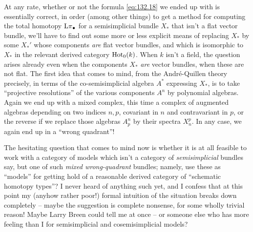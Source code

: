 At any rate, whether or not the formula \eqref{eq:132.18} we ended up
with is essentially correct, in order (among other things) to get a
method for computing the total homotopy $\operatorname{L\pi}_\bullet$ for a
semisimplicial bundle $X_*$ that isn't a flat vector bundle, we'll
have to find out some more or less explicit means of replacing $X_*$
by some $X_*'$ whose components \emph{are} flat vector bundles, and
which is isomorphic to $X_*$ in the relevant derived category
$\operatorname{Hot}_0(k)$. When $k$ isn't a field, the question arises already
even when the components $X_*$ \emph{are} vector bundles, when these
are not flat. The first idea that comes to mind, from the
André-Quillen theory precisely, in terms of the co-semisimplicial
algebra $A^*$ expressing $X_*$, is to take ``projective resolutions''
of the various components $A^n$ by polynomial algebras. Again we end
up with a mixed complex, this time a complex of augmented algebras
depending on two indices $n,p$, covariant in $n$ and contravariant in
$p$, or the reverse if we replace those algebras $A^n_p$ by their
spectra $X_n^p$. In any case, we again end up in a ``wrong quadrant''!

The hesitating question that comes to mind now is whether it is at all
feasible to work with a category of models which isn't a category of
\emph{semisimplicial} bundles say, but one of such \emph{mixed
  wrong-quadrant} bundles; namely, use these as ``models'' for getting
hold of a reasonable derived category of ``schematic homotopy types''?
I never heard of anything such yet, and I confess that at this point
my (anyhow rather poor!) formal intuition of the situation breaks down
completely -- maybe the suggestion is complete nonsense, for some
wholly trivial reason! Maybe Larry Breen could tell me at once -- or
someone else who has more feeling than I for semisimplicial and
cosemisimplicial models?

